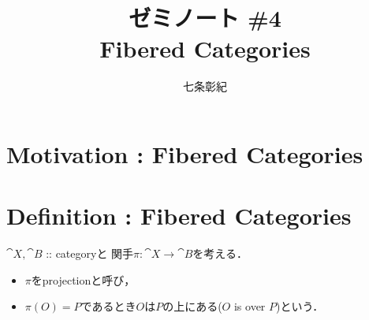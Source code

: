 \documentclass[a4paper, dvipdfmx]{jsarticle}
\begin{document}
\title{ゼミノート \#4 \\ Fibered Categories}
\author{七条彰紀}
\maketitle

\section{Motivation : Fibered Categories}
\cite{ASS}

\section{Definition : Fibered Categories}
    $\cat{X}, \cat{B}$ :: categoryと
    関手$\pi \colon \cat{X} \to \cat{B}$を考える．
    \begin{itemize}
    \item 
        $\pi$をprojectionと呼び，
    \item
        $\pi(O)=P$であるとき$O$は$P$の上にある($O$ is over $P$)という．
    \end{itemize}
\end{document}
